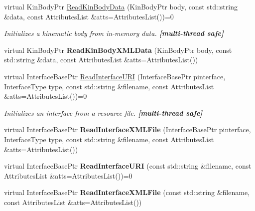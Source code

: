 \begin{DoxyCompactItemize}
\item 
virtual KinBodyPtr \hyperlink{classOpenRAVE_1_1EnvironmentBase_a5539fbbaefc308651ace750c133f3adf}{ReadKinBodyData} (KinBodyPtr body, const std::string \&data, const AttributesList \&atts=AttributesList())=0
\begin{DoxyCompactList}\small\item\em Initializes a kinematic body from in-\/memory data. {\bfseries \mbox{[}multi-\/thread safe\mbox{]}} \item\end{DoxyCompactList}\item 
\hypertarget{classOpenRAVE_1_1EnvironmentBase_af8fde0c46dbd2c833936e7524ab54436}{
virtual KinBodyPtr {\bfseries ReadKinBodyXMLData} (KinBodyPtr body, const std::string \&data, const AttributesList \&atts=AttributesList())}
\label{classOpenRAVE_1_1EnvironmentBase_af8fde0c46dbd2c833936e7524ab54436}

\item 
virtual InterfaceBasePtr \hyperlink{classOpenRAVE_1_1EnvironmentBase_abe79c2e2ad5f11d0c978269d737816dd}{ReadInterfaceURI} (InterfaceBasePtr pinterface, InterfaceType type, const std::string \&filename, const AttributesList \&atts=AttributesList())=0
\begin{DoxyCompactList}\small\item\em Initializes an interface from a resource file. {\bfseries \mbox{[}multi-\/thread safe\mbox{]}} \item\end{DoxyCompactList}\item 
\hypertarget{classOpenRAVE_1_1EnvironmentBase_ae5185403a61b5ba3bf92fa8513bc108c}{
virtual InterfaceBasePtr {\bfseries ReadInterfaceXMLFile} (InterfaceBasePtr pinterface, InterfaceType type, const std::string \&filename, const AttributesList \&atts=AttributesList())}
\label{classOpenRAVE_1_1EnvironmentBase_ae5185403a61b5ba3bf92fa8513bc108c}

\item 
\hypertarget{classOpenRAVE_1_1EnvironmentBase_a6aa2fca70fe18cb21cca37300669e025}{
virtual InterfaceBasePtr {\bfseries ReadInterfaceURI} (const std::string \&filename, const AttributesList \&atts=AttributesList())=0}
\label{classOpenRAVE_1_1EnvironmentBase_a6aa2fca70fe18cb21cca37300669e025}

\item 
\hypertarget{classOpenRAVE_1_1EnvironmentBase_ae0eaa5085685e141912cb4ebbcaef986}{
virtual InterfaceBasePtr {\bfseries ReadInterfaceXMLFile} (const std::string \&filename, const AttributesList \&atts=AttributesList())}
\label{classOpenRAVE_1_1EnvironmentBase_ae0eaa5085685e141912cb4ebbcaef986}


\end{DoxyCompactItemize}
